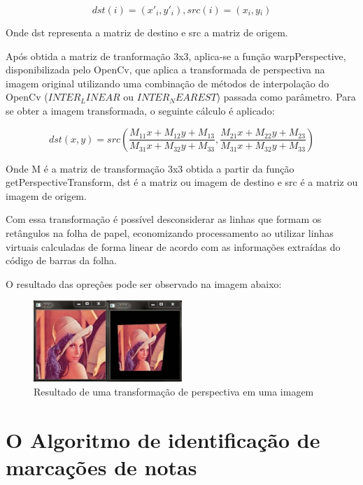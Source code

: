 \documentclass[12pt]{report}
\begin{document}
{\begin{equation}
  dst(i) = (x'{}_i,y'{}_i), src(i) = (x{}_i,y{}_i)
\end{equation}

Onde dst representa a matriz de destino e src a matriz de origem.

Após obtida a matriz de tranformação 3x3, aplica-se a função warpPerspective, disponibilizada pelo OpenCv, que aplica a transformada de perspectiva na imagem original utilizando uma combinação de métodos de interpolação do OpenCv ({\it $INTER_LINEAR$} ou {\it $INTER_NEAREST$}) passada como parâmetro. Para se obter a imagem transformada, o seguinte cálculo é aplicado:

\begin{equation}
dst(x, y) = src \left(\dfrac{M_{11} x + M_{12} y + M_{13}}{M_{31} x + M_{32} y + M_{33}}, \dfrac{M_{21} x + M_{22} y + M_{23}}{M_{31} x + M_{32} y + M_{33}}\right)
\end{equation}

Onde M é a matriz de transformação 3x3 obtida a partir da função getPerspectiveTransform, dst é a matriz ou imagem de destino e src é a matriz ou imagem de origem.

Com essa transformação é possível desconsiderar as linhas que formam os retângulos na folha de papel, economizando processamento ao utilizar linhas virtuais calculadas de forma linear de acordo com as informações extraídas do código de barras da folha.

O resultado das opreções pode ser observado na imagem abaixo:

\begin{figure}[H]
  \centering
    \includegraphics[width=0.5\textwidth]{imagens/Perspective_Transform.JPG}
    \caption{Resultado de uma transformação de perspectiva em uma imagem}
  \label{fig:perspectiva}
\end{figure}

\chapter{O Algoritmo de identificação de marcações de notas}
\label{cha:cha2}

}
\end{document}
